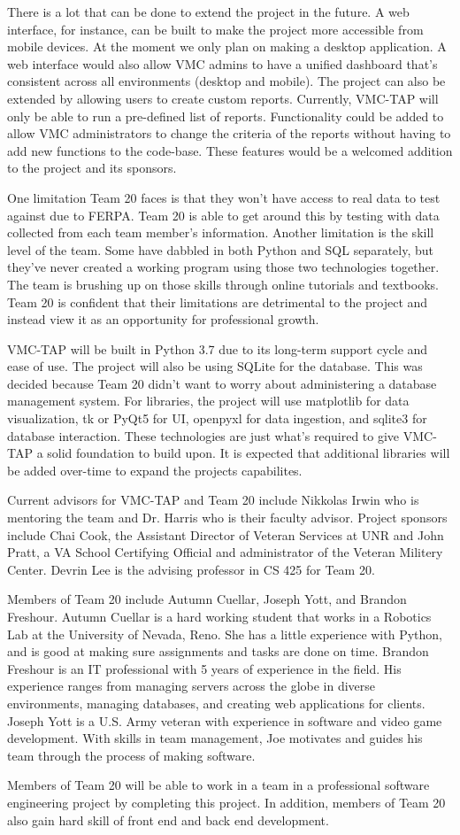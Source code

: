 There is a lot that can be done to extend the project in the future. A web interface, for instance, can be built to make the project more accessible from mobile devices. At the moment we only plan on making a desktop application. A web interface would also allow VMC admins to have a unified dashboard that’s consistent across all environments (desktop and mobile). The project can also be extended by allowing users to create custom reports. Currently, VMC-TAP will only be able to run a pre-defined list of reports. Functionality could be added to allow VMC administrators to change the criteria of the reports without having to add new functions to the code-base. These features would be a welcomed addition to the project and its sponsors.

One limitation Team 20 faces is that they won’t have access to real data to test against due to FERPA. Team 20 is able to get around this by testing with data collected from each team member’s information. Another limitation is the skill level of the team. Some have dabbled in both Python and SQL separately, but they’ve never created a working program using those two technologies together. The team is brushing up on those skills through online tutorials and textbooks. Team 20 is confident that their limitations are detrimental to the project and instead view it as an opportunity for professional growth.

VMC-TAP will be built in Python 3.7 due to its long-term support cycle and ease of use. The project will also be using SQLite for the database. This was decided because Team 20 didn't want to worry about administering a database management system. For libraries, the project will use matplotlib for data visualization, tk or PyQt5 for UI, openpyxl for data ingestion, and sqlite3 for database interaction. These technologies are just what's required to give VMC-TAP a solid foundation to build upon. It is expected that additional libraries will be added over-time to expand the projects capabilites.

Current advisors for VMC-TAP and Team 20 include Nikkolas Irwin who is mentoring the team and Dr. Harris who is their faculty advisor. Project sponsors include Chai Cook, the Assistant Director of Veteran Services at UNR and John Pratt, a VA School Certifying Official and administrator of the Veteran Militery Center. Devrin Lee is the advising professor in CS 425 for Team 20.

Members of Team 20 include Autumn Cuellar, Joseph Yott, and Brandon Freshour. Autumn Cuellar is a hard working student that works in a Robotics Lab at the University of Nevada, Reno. She has a little experience with Python, and is good at making sure assignments and tasks are done on time. Brandon Freshour is an IT professional with 5 years of experience in the field. His experience ranges from managing servers across the globe in diverse environments, managing databases, and creating web applications for clients. Joseph Yott is a U.S. Army veteran with experience in software and video game development. With skills in team management, Joe motivates and guides his team through the process of making software. 

Members of Team 20 will be able to work in a team in a professional software engineering project by completing this project. In addition, members of Team 20 also gain hard skill of front end and back end development. 


